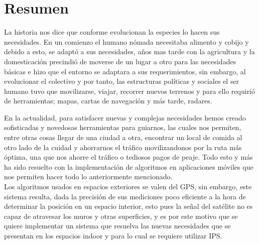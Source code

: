 \chapter*{Resumen}

La historia nos dice que conforme evolucionan la especies lo hacen sus necesidades. En un comienzo el humano nómada necesitaba alimento y cobijo y debido a esto, se adaptó a sus necesidades, años mas tarde con la agricultura y la domesticación precindió de moverse de un lugar a otro para las necesidades básicas e hizo que el entorno se adaptara a sus requerimientos, sin embargo, al evolucionar el colectivo y por tanto, las estructuras políticas y sociales el ser humano tuvo que movilizarse, viajar, recorrer nuevos terrenos y para ello requirió de herramientas; mapas, cartas de navegación y más tarde, radares.

En la actualidad, para satisfacer nuevas y complejas necesidades hemos creado sofisticadas y novedosas herramientas para guiarnos, las cuales nos permiten, entre otras cosas llegar de una ciudad a otra, encontrar un local de comida al otro lado de la cuidad y ahorrarnos el tráfico movilizandonos por la ruta más óptima, una que nos ahorre el tráfico o tediosos pagos de peaje. Todo esto y más ha sido resuelto con la implementación de algoritmos en aplicaciones móviles que nos permiten hacer todo lo anteriormente mencionado.\\

Los algoritmos usados en espacios exteriores se valen del \ac{GPS}, sin embargo, este sistema resulta, dada la precisión de sus mediciones poco eficiente a la hora de determinar la posición en un espacio interior, esto pues la señal del satélite no es capaz de atravesar los muros y otras superficies, y es por este motivo que se quiere implementar un sistema que resuelva las nuevas necesidades que se presentan en los espacios indoor y para lo cual se requiere utilizar \ac{IPS}.\\
